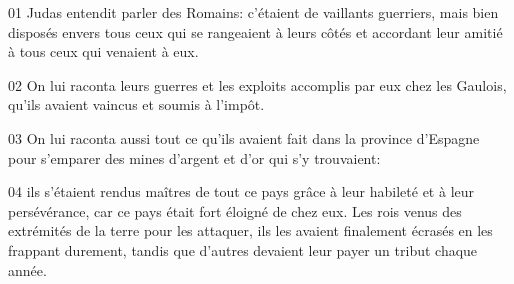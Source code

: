 01 Judas entendit parler des Romains: c’étaient de vaillants guerriers, mais bien disposés envers tous ceux qui se rangeaient à leurs côtés et accordant leur amitié à tous ceux qui venaient à eux.

02 On lui raconta leurs guerres et les exploits accomplis par eux chez les Gaulois, qu’ils avaient vaincus et soumis à l’impôt.

03 On lui raconta aussi tout ce qu’ils avaient fait dans la province d’Espagne pour s’emparer des mines d’argent et d’or qui s’y trouvaient:

04 ils s’étaient rendus maîtres de tout ce pays grâce à leur habileté et à leur persévérance, car ce pays était fort éloigné de chez eux. Les rois venus des extrémités de la terre pour les attaquer, ils les avaient finalement écrasés en les frappant durement, tandis que d’autres devaient leur payer un tribut chaque année.